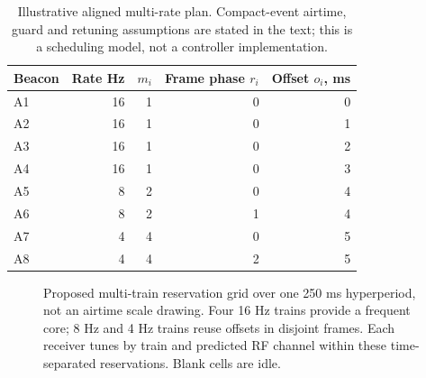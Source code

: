 \documentclass[11pt,letterpaper]{article}
\begin{document}
\begin{table}[ht]\centering\small
\caption{Illustrative aligned multi-rate plan. Compact-event airtime, guard and retuning assumptions are stated in the text; this is a scheduling model, not a controller implementation.}\label{tab:rates}
\begin{tabular}{@{}lrrrr@{}}\toprule
Beacon & Rate Hz & $m_i$ & Frame phase $r_i$ & Offset $o_i$, ms\\\midrule
A1&16&1&0&0\\
A2&16&1&0&1\\
A3&16&1&0&2\\
A4&16&1&0&3\\
A5&8&2&0&4\\
A6&8&2&1&4\\
A7&4&4&0&5\\
A8&4&4&2&5\\\bottomrule\end{tabular}
\end{table}

\begin{figure}[ht]\centering
{}
\caption{Proposed multi-train reservation grid over one 250 ms hyperperiod, not an airtime scale drawing. Four 16 Hz trains provide a frequent core; 8 Hz and 4 Hz trains reuse offsets in disjoint frames. Each receiver tunes by train and predicted RF channel within these time-separated reservations. Blank cells are idle.}\label{fig:slots}
\end{figure}
\end{document}

